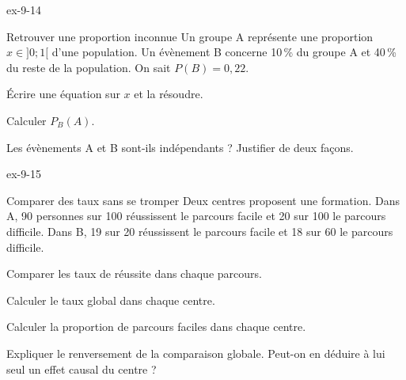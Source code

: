 \begin{blocLivre}{ex-9-14}
\begin{exercice}[3]{Retrouver une proportion inconnue}
Un groupe A représente une proportion $x\in]0;1[$ d’une population. Un évènement B concerne 10\,\% du groupe A et 40\,\% du reste de la population. On sait $P(B)=0{,}22$.\begin{questions}
\item Écrire une équation sur $x$ et la résoudre.
\item Calculer $P_B(A)$.
\item Les évènements A et B sont-ils indépendants ? Justifier de deux façons.
\end{questions}
\label{figlivre-r09-14-ex}

\end{exercice}
\end{blocLivre}
\begin{blocLivre}{ex-9-15}
\begin{exercice}[3]{Comparer des taux sans se tromper}
Deux centres proposent une formation. Dans A, 90 personnes sur 100 réussissent le parcours facile et 20 sur 100 le parcours difficile. Dans B, 19 sur 20 réussissent le parcours facile et 18 sur 60 le parcours difficile.\begin{questions}
\item Comparer les taux de réussite dans chaque parcours.
\item Calculer le taux global dans chaque centre.
\item Calculer la proportion de parcours faciles dans chaque centre.
\item Expliquer le renversement de la comparaison globale. Peut-on en déduire à lui seul un effet causal du centre ?
\end{questions}
\end{exercice}
\end{blocLivre}
